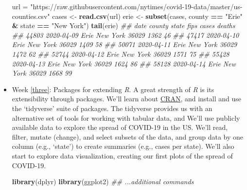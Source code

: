 \documentclass[]{book}
\newenvironment{Shaded}{\begin{snugshade}}{\end{snugshade}}
\newcommand{\CommentTok}[1]{\textcolor[rgb]{0.56,0.35,0.01}{\textit{#1}}}
\newcommand{\KeywordTok}[1]{\textcolor[rgb]{0.13,0.29,0.53}{\textbf{#1}}}
\newcommand{\NormalTok}[1]{#1}
\newcommand{\OperatorTok}[1]{\textcolor[rgb]{0.81,0.36,0.00}{\textbf{#1}}}
\newcommand{\StringTok}[1]{\textcolor[rgb]{0.31,0.60,0.02}{#1}}
\begin{document}
\begin{itemize}
\begin{Shaded}
\begin{Highlighting}[]
\NormalTok{url =}\StringTok{ "https://raw.githubusercontent.com/nytimes/covid-19-data/master/us-counties.csv"}
\NormalTok{cases <-}\StringTok{ }\KeywordTok{read.csv}\NormalTok{(url)}
\NormalTok{erie <-}\StringTok{ }\KeywordTok{subset}\NormalTok{(cases, county }\OperatorTok{==}\StringTok{ "Erie"} \OperatorTok{&}\StringTok{ }\NormalTok{state }\OperatorTok{==}\StringTok{ "New York"}\NormalTok{)}
\KeywordTok{tail}\NormalTok{(erie)}
\CommentTok{##             date county    state  fips cases deaths}
\CommentTok{## 44803 2020-04-09   Erie New York 36029  1362     46}
\CommentTok{## 47417 2020-04-10   Erie New York 36029  1409     58}
\CommentTok{## 50071 2020-04-11   Erie New York 36029  1472     62}
\CommentTok{## 52744 2020-04-12   Erie New York 36029  1571     75}
\CommentTok{## 55428 2020-04-13   Erie New York 36029  1624     86}
\CommentTok{## 58128 2020-04-14   Erie New York 36029  1668     99}
\end{Highlighting}
\end{Shaded}
\item
  Week \ref{three}: Packages for extending \emph{R}. A great strength of \emph{R} is its extensibility through packages. We'll learn about \href{https://cran.r-project.org}{CRAN}, and install and use the `tidyverse' suite of packages. The tidyverse provides us with an alternative set of tools for working with tabular data, and We'll use publicly available data to explore the spread of COVID-19 in the US. We'll read, filter, mutate (change), and select subsets of the data, and group data by one column (e.g., `state') to create summaries (e.g., cases per state). We'll also start to explore data visualization, creating our first plots of the spread of COVID-19.

\begin{Shaded}
\begin{Highlighting}[]
\KeywordTok{library}\NormalTok{(dplyr)}
\KeywordTok{library}\NormalTok{(ggplot2)}
\CommentTok{## ...additional commands}
\end{Highlighting}
\end{Shaded}


\end{itemize}
\end{document}
